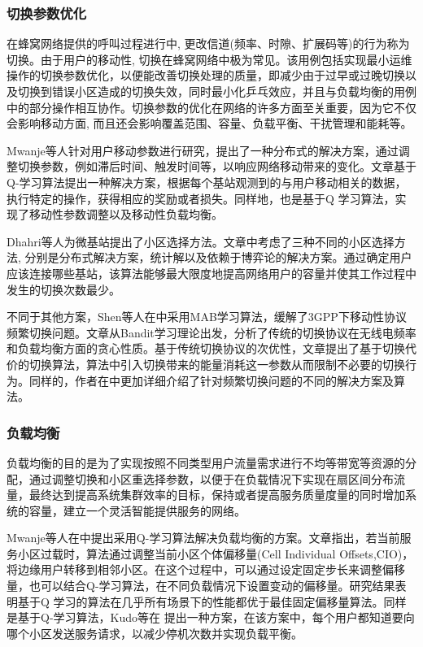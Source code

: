 \documentclass{IEEEtran}
\begin{document}

\subsubsection{切换参数优化}
在蜂窝网络提供的呼叫过程进行中, 更改信道(频率、时隙、扩展码等)的行为称为 切换。由于用户的移动性, 切换在蜂窝网络中极为常见。该用例包括实现最小运维操作的切换参数优化，以便能改善切换处理的质量，即减少由于过早或过晚切换以及切换到错误小区造成的切换失效，同时最小化乒乓效应，并且与负载均衡的用例中的部分操作相互协作。切换参数的优化在网络的许多方面至关重要，因为它不仅会影响移动方面, 而且还会影响覆盖范围、容量、负载平衡、干扰管理和能耗等。


Mwanje等人\cite{Mwanje2014}针对用户移动参数进行研究，提出了一种分布式的解决方案，通过调整切换参数，例如滞后时间、触发时间等，以响应网络移动带来的变化。文章基于Q-学习算法提出一种解决方案，根据每个基站观测到的与用户移动相关的数据，执行特定的操作，获得相应的奖励或者损失。同样地，\cite{Mwanje2013}也是基于Q 学习算法，实现了移动性参数调整以及移动性负载均衡。

Dhahri等人\cite{Dhahri2014}为微基站提出了小区选择方法。文章中考虑了三种不同的小区选择方法, 分别是分布式解决方案，统计解以及依赖于博弈论的解决方案。通过确定用户应该连接哪些基站，该算法能够最大限度地提高网络用户的容量并使其工作过程中发生的切换次数最少。

不同于其他方案，Shen等人在\cite{Shen2017}中采用MAB学习算法，缓解了3GPP下移动性协议频繁切换问题。文章从Bandit学习理论出发，分析了传统的切换协议在无线电频率和负载均衡方面的贪心性质。基于传统切换协议的次优性，文章提出了基于切换代价的切换算法，算法中引入切换带来的能量消耗这一参数从而限制不必要的切换行为。同样的，作者在\cite{Shen2016}中更加详细介绍了针对频繁切换问题的不同的解决方案及算法。



\subsubsection{负载均衡}

负载均衡的目的是为了实现按照不同类型用户流量需求进行不均等带宽等资源的分配，通过调整切换和小区重选择参数，以便于在负载情况下实现在扇区间分布流量，最终达到提高系统集群效率的目标，保持或者提高服务质量度量的同时增加系统的容量，建立一个灵活智能提供服务的网络。


Mwanje等人在\cite{Mwanje2013}中提出采用Q-学习算法解决负载均衡的方案。文章指出，若当前服务小区过载时，算法通过调整当前小区个体偏移量(Cell Individual Offsets,CIO)，将边缘用户转移到相邻小区。在这个过程中，可以通过设定固定步长来调整偏移量，也可以结合Q-学习算法，在不同负载情况下设置变动的偏移量。研究结果表明基于Q 学习的算法在几乎所有场景下的性能都优于最佳固定偏移量算法。同样是基于Q-学习算法，Kudo等在\cite{Kudo2014} 提出一种方案，在该方案中，每个用户都知道要向哪个小区发送服务请求，以减少停机次数并实现负载平衡。
\end{document}
